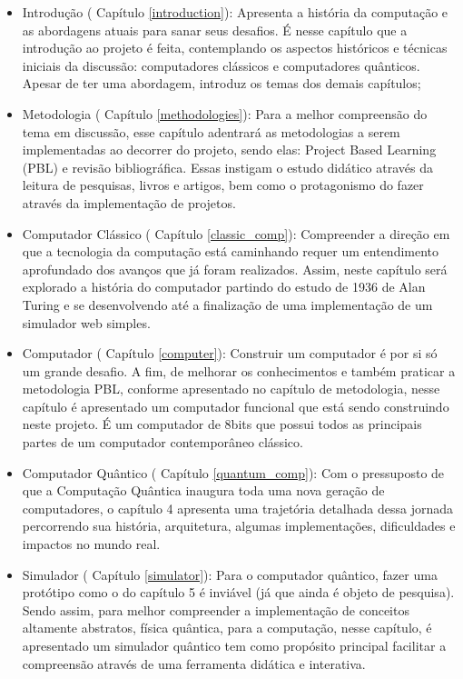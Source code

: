\begin{itemize}
  \item Introdução ( Capítulo \ref{introduction}): Apresenta a história da computação e as abordagens atuais para sanar seus desafios. É nesse capítulo que a introdução ao projeto é feita, contemplando os aspectos históricos e técnicas iniciais da discussão: computadores clássicos e computadores quânticos. Apesar de ter uma abordagem, introduz os temas dos demais capítulos;
  \item Metodologia ( Capítulo \ref{methodologies}): Para a melhor compreensão do tema em discussão, esse capítulo adentrará as metodologias a serem implementadas ao decorrer do projeto, sendo elas: Project Based Learning (PBL) e revisão bibliográfica. Essas instigam o estudo didático através da leitura de pesquisas, livros e artigos, bem como o protagonismo do fazer através da implementação de projetos.
  \item Computador Clássico ( Capítulo \ref{classic_comp}): Compreender a direção em que a tecnologia da computação está caminhando requer um entendimento aprofundado dos avanços que já foram realizados. Assim, neste capítulo será explorado a história do computador partindo do estudo de 1936 de Alan Turing e se desenvolvendo até a finalização de uma implementação de um simulador web simples.
  \item Computador ( Capítulo \ref{computer}): Construir um computador é por si só um grande desafio. A fim, de melhorar os conhecimentos e também praticar a metodologia PBL, conforme apresentado no capítulo de metodologia, nesse capítulo é apresentado um computador funcional que está sendo construindo neste projeto. É um computador de 8bits que possui todos as principais partes de um computador contemporâneo clássico.
  \item Computador Quântico ( Capítulo \ref{quantum_comp}): Com o pressuposto de que a Computação Quântica inaugura toda uma nova geração de computadores, o capítulo 4 apresenta uma trajetória detalhada dessa jornada percorrendo sua história, arquitetura, algumas implementações, dificuldades e impactos no mundo real.
  \item Simulador ( Capítulo \ref{simulator}): Para o computador quântico, fazer uma protótipo como o do capítulo 5 é inviável (já que ainda é objeto de pesquisa). Sendo assim, para melhor compreender a implementação de conceitos altamente abstratos, física quântica, para a computação, nesse capítulo, é apresentado um simulador quântico tem como propósito principal facilitar a compreensão através de uma ferramenta didática e interativa.

\end{itemize}

